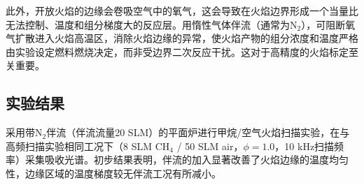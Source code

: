此外，开放火焰的边缘会卷吸空气中的氧气，这会导致在火焰边界形成一个当量比无法控制、温度和组分梯度大的反应层。用惰性气体伴流（通常为N$_2$），可阻断氧气扩散进入火焰高温区，消除火焰边缘的异常，使火焰产物的组分浓度和温度严格由实验设定燃料燃烧决定，而非受边界二次反应干扰。这对于高精度的火焰标定至关重要。

\subsection{实验结果}

采用带N$_2$伴流（伴流流量20 SLM）的平面炉进行甲烷/空气火焰扫描实验，在与高频扫描实验相同工况下（8 SLM CH$_4$ / 50 SLM air，$\phi=1.0$，10 kHz扫描频率）采集吸收光谱。初步结果表明，伴流的加入显著改善了火焰边缘的温度均匀性，边缘区域的温度梯度较无伴流工况有所减小。